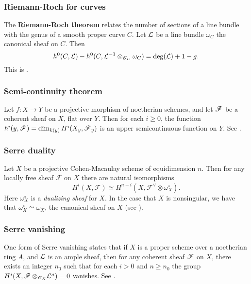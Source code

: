 \documentclass[11pt, english]{article}
\begin{document}
\subsubsection{Riemann-Roch for curves}
\label{riemannroch}

The \textbf{Riemann-Roch theorem} relates the number of sections of a line bundle with the genus of a smooth proper curve $C$. Let $\mathcal{L}$ be a line bundle $\omega_C$ the canonical sheaf on $C$. Then
\[
h^0(C,\mathcal{L}) - h^0(C, \mathcal{L}^{-1} \otimes_{\operatorname{\mathscr{O}}_{C}} \omega_C) = \deg(\mathcal{L}) +1 -g.
\]
This is \cite[Theorem IV.1.3]{hartshorne}.

\subsubsection{Semi-continuity theorem}
\label{semicontinuity}

Let $f:X \to Y$ be a projective morphism of noetherian schemes, and let $\operatorname{\mathscr{F}}$ be a coherent sheaf on $X$, flat over $Y$. Then for each $i \geq 0$, the function $h^i(y,\operatorname{\mathscr{F}})=\dim_{k(y)} H^i(X_y,\operatorname{\mathscr{F}}_y)$ is an upper semicontinuous function on $Y$. See \cite[Chapter III, Theorem 12.8]{hartshorne}.

\subsubsection{Serre duality}
\label{serreduality}

Let $X$ be a projective Cohen-Macaulay scheme of equidimension $n$. Then for any locally free sheaf $\mathcal F$ on $X$ there are natural isomorphisms
\[
H^i(X,\mathcal F) \simeq H^{n-i}(X, \mathcal F^\vee \otimes \omega_X^\circ).
\]
Here $\omega_X^\circ$ is a \emph{dualizing sheaf} for $X$. In the case that $X$ is nonsingular, we have that $\omega_X^\circ \simeq \omega_X$, the canonical sheaf on $X$ (see \cite[Chapter III, Corollary 7.12]{hartshorne}). 

\subsubsection{Serre vanishing}
\label{serrevanishing}

One form of Serre vanishing states that if $X$ is a proper scheme over a noetherian ring $A$, and $\mathcal{L}$ is an \hyperref[amplelinebundle]{ample} sheaf, then for any coherent sheaf $\operatorname{\mathscr{F}}$ on $X$, there exists an integer $n_0$ such that for each $i > 0$ and $n \geq n_0$ the group $H^i(X, \operatorname{\mathscr{F}} \otimes_{\operatorname{\mathscr{O}}_X} \mathcal{L}^n)=0$ vanishes. See \cite[Proposition III.5.3]{hartshorne}.
\end{document}
